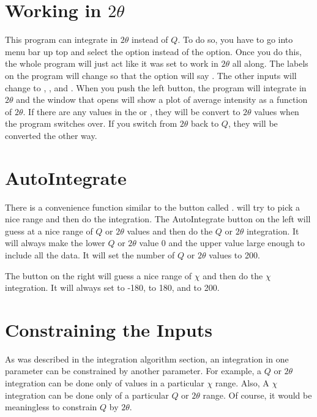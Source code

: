 \section{\texorpdfstring{Working in $2\theta$}{Working in 2theta}}

This program can integrate in $2\theta$ instead of $Q$. To 
do so, you have to go into menu bar up top and select
the  option instead of the
 option. Once you do this, the whole program
will just act like it was set to work in $2\theta$ all
along. The labels
on the program will change so that the option will say
. The other inputs will change
to , , and
. When you push the left
 button, the program will integrate 
in $2\theta$ and the window that opens will show a plot
of average intensity as a function of $2\theta$.
If there are any values in the  or
, they will be convert to $2\theta$
values when the program switches over. If you switch
from $2\theta$ back to $Q$, they will be converted
the other way.

\section{AutoIntegrate}

There is a convenience function similar to the
 button called . 
 will try to pick a nice range 
and then do the integration. The AutoIntegrate button 
on the left will guess at a nice range of $Q$ 
or $2\theta$ values and then do the $Q$ or
$2\theta$ integration.
It will always make the lower $Q$ or $2\theta$ 
value 0 and the upper value large enough
to include all the data.
It will set the number of $Q$ or $2\theta$ values to
200.

The  button on the right 
will guess a nice range of $\chi$ and then
do the $\chi$ integration. It will always 
set  to -180,  to
180, and  to 200.

\section{Constraining the Inputs}

As was described in the integration algorithm 
section, an integration in one parameter can 
be constrained by another parameter. For example,
a $Q$ or $2\theta$ integration can be done only 
of values in a particular $\chi$ range. Also,
A $\chi$ integration can be done only of a
particular $Q$ or $2\theta$ range. Of course,
it would be meaningless to constrain $Q$ by
$2\theta$.

